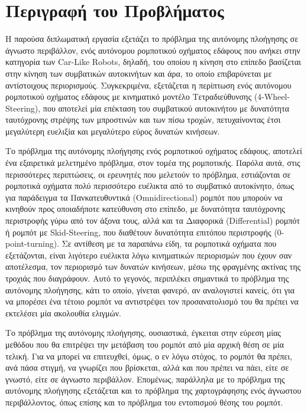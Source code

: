 
\section{Περιγραφή του Προβλήματος}
Η παρούσα διπλωματική εργασία εξετάζει το πρόβλημα της αυτόνομης πλοήγησης σε άγνωστο περιβάλλον, ενός αυτόνομου ρομποτικού οχήματος εδάφους που ανήκει στην κατηγορία των Car-Like Robots, δηλαδή, του οποίου η κίνηση στο επίπεδο βασίζεται στην κίνηση των συμβατικών αυτοκινήτων και άρα, το οποίο επιβαρύνεται με αντίστοιχους περιορισμούς. Συγκεκριμένα, εξετάζεται η περίπτωση ενός αυτόνομου ρομποτικού οχήματος εδάφους με κινηματικό μοντέλο Τετραδιεύθυνσης (4-Wheel-Steering), που αποτελεί μία επέκταση του συμβατικού αυτοκινήτου με δυνατότητα ταυτόχρονης στρέψης των μπροστινών και των πίσω τροχών, πετυχαίνοντας έτσι μεγαλύτερη ευελιξία και μεγαλύτερο εύρος δυνατών κινήσεων.

\bigskip
Το πρόβλημα της αυτόνομης πλοήγησης ενός ρομποτικού οχήματος εδάφους, αποτελεί ένα εξαιρετικά μελετημένο πρόβλημα, στον τομέα της ρομποτικής. Παρόλα αυτά, στις περισσότερες περιπτώσεις, οι ερευνητές που μελετούν το πρόβλημα, εστιάζονται σε ρομποτικά οχήματα πολύ περισσότερο ευέλικτα από το συμβατικό αυτοκίνητο, όπως για παράδειγμα τα Πανκατευθυντικά (Omnidirectional) ρομπότ που μπορούν να κινηθούν προς οποιαδήποτε κατεύθυνση στο επίπεδο, με δυνατότητα ταυτόχρονης περιστροφής γύρω από τον άξονα τους, αλλά και τα Διαφορικά (Differential) ρομπότ ή ρομπότ με Skid-Steering, που διαθέτουν δυνατότητα επιτόπου περιστροφής (0-point-turning). Σε αντίθεση με τα παραπάνω είδη, τα ρομποτικά οχήματα που εξετάζονται, είναι λιγότερο ευέλικτα λόγω κινηματικών περιορισμών που έχουν σαν αποτέλεσμα, τον περιορισμό των δυνατών κινήσεων, μέσω της φραγμένης ακτίνας της τροχιάς που διαγράφουν. Αυτό το γεγονός, περιπλέκει σημαντικά το πρόβλημα της αυτόνομης πλοήγησης, κάτι το οποίο, γίνεται φανερό, αν αναλογιστεί κανείς, ότι για να μπορέσει ένα τέτοιο ρομπότ να αντιστρέψει τον προσανατολισμό του θα πρέπει να εκτελέσει μία ακολουθία ελιγμών.

\bigskip
Το πρόβλημα της αυτόνομης πλοήγησης, ουσιαστικά, έγκειται στην εύρεση μίας μεθόδου που θα επιτρέψει την μετάβαση του ρομπότ από μία αρχική θέση σε μία τελική. Για να μπορεί να επιτευχθεί, όμως, ο εν λόγω στόχος, το ρομπότ θα πρέπει, ανά πάσα στιγμή, να γνωρίζει που βρίσκεται, αλλά και που πρέπει να πάει, είτε σε γνωστό, είτε σε άγνωστο περιβάλλον. Επομένως, παράλληλα με το πρόβλημα της αυτόνομης πλοήγησης εξετάζεται και το πρόβλημα της χαρτογράφησης ενός άγνωστου περιβάλλοντος, όπως επίσης και το πρόβλημα του εντοπισμού θέσης του ρομπότ.

